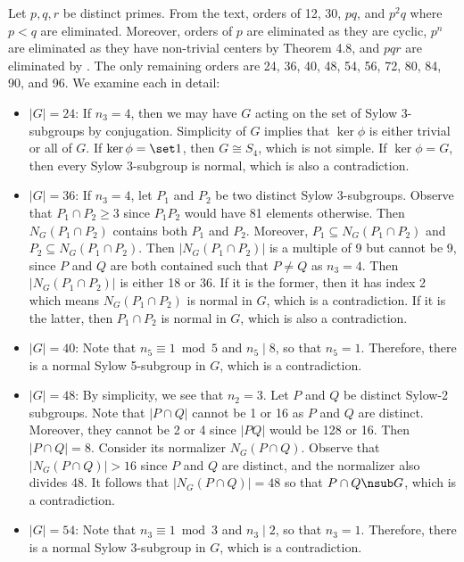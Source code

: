 \begin{sol}[spsol]
	Let $p, q, r$ be distinct primes.
	From the text, orders of 12, 30, $pq$, and $p^2q$ where $p < q$ are eliminated.
	Moreover, orders of $p$ are eliminated as they are cyclic, $p^n$ are eliminated as they have non-trivial centers by Theorem 4.8, and $pqr$ are eliminated by .
	The only remaining orders are 24, 36, 40, 48, 54, 56, 72, 80, 84, 90, and 96.
	We examine each in detail:
	\begin{itemize}
		\item $|G| = 24$: If $n_3 = 4$, then we may have $G$ acting on the set of Sylow 3-subgroups by conjugation.
	Simplicity of $G$ implies that $\ker\phi$ is either trivial or all of $G$.
	If $\ker\phi = \set 1$, then $G \cong S_4$, which is not simple.
	If $\ker\phi = G$, then every Sylow 3-subgroup is normal, which is also a contradiction. 
		\item $|G| = 36$: If $n_3 = 4$, let $P_1$ and $P_2$ be two distinct Sylow 3-subgroups.
	Observe that $P_1 \cap P_2 \geq 3$ since $P_1P_2$ would have 81 elements otherwise.
	Then $N_G(P_1 \cap P_2)$ contains both $P_1$ and $P_2$.
	Moreover, $P_1 \subseteq N_G(P_1 \cap P_2)$ and $P_2 \subseteq N_G(P_1 \cap P_2)$.
	Then $|N_G(P_1 \cap P_2)|$ is a multiple of 9 but cannot be 9, since $P$ and $Q$ are both contained such that $P \neq Q$ as $n_3 = 4$.
	Then $|N_G(P_1 \cap P_2)|$ is either 18 or 36.
	If it is the former, then it has index 2 which means $N_G(P_1 \cap P_2)$ is normal in $G$, which is a contradiction.
	If it is the latter, then $P_1 \cap P_2$ is normal in $G$, which is also a contradiction. 
		\item $|G| = 40$: Note that $n_5 \equiv 1 \bmod 5$ and $n_5 \mid 8$, so that $n_5 = 1$.
	Therefore, there is a normal Sylow 5-subgroup in $G$, which is a contradiction.
		\item $|G| = 48$: By simplicity, we see that $n_2 = 3$.
	Let $P$ and $Q$ be distinct Sylow-2 subgroups.
	Note that $|P \cap Q|$ cannot be 1 or 16 as $P$ and $Q$ are distinct.
	Moreover, they cannot be 2 or 4 since $|PQ|$ would be 128 or 16.
	Then $|P \cap Q| = 8$.
	Consider its normalizer $N_G(P \cap Q)$.
	Observe that $|N_G(P \cap Q)| > 16$ since $P$ and $Q$ are distinct, and the normalizer also divides 48.
	It follows that $|N_G(P \cap Q)| = 48$ so that $P \cap Q \nsub G$, which is a contradiction.
		\item $|G| = 54$: Note that $n_3 \equiv 1 \bmod 3$ and $n_3 \mid 2$, so that $n_3 = 1$.
	Therefore, there is a normal Sylow 3-subgroup in $G$, which is a contradiction.

\end{itemize}
\end{sol}
